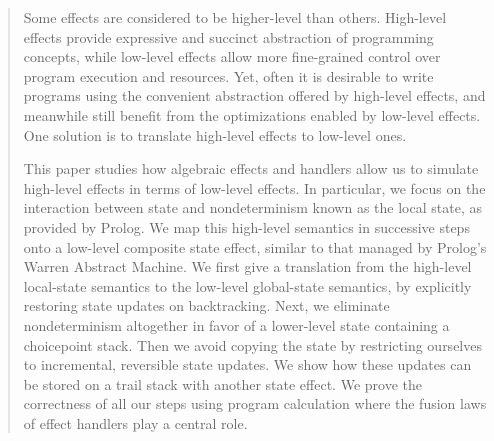 \documentclass[nolinenum]{jfp}
\begin{document}
\begin{abstract}

  Some effects are considered to be higher-level than others.
  High-level effects provide expressive and succinct abstraction of
  programming concepts, while low-level effects allow more fine-grained
  control over program execution and resources.
  Yet, often it is desirable to write programs using the convenient abstraction
  offered by high-level effects, and meanwhile still benefit
  from the optimizations enabled by low-level effects.
  One solution is to translate high-level effects to low-level ones.

  This paper studies how algebraic effects and handlers allow us to simulate
  high-level effects in terms of low-level effects.
  In particular, we focus on the interaction between state and
  nondeterminism known as the local state, as provided by Prolog. We map
  this high-level semantics in successive steps
  onto a low-level composite state effect, similar to that managed by Prolog's Warren Abstract
  Machine.
  We first give a translation from the high-level local-state semantics to
  the low-level global-state semantics, by explicitly restoring state updates on
  backtracking. Next, we eliminate nondeterminism altogether in favor of a
  lower-level state containing a choicepoint stack.
  Then we avoid copying the state by restricting ourselves to incremental, reversible state updates.
  We show how these updates can be stored on a trail stack with another state effect.
  We prove the correctness of all our steps using program calculation where
  the fusion laws of effect handlers play a central role.

\end{abstract}
\end{document}
